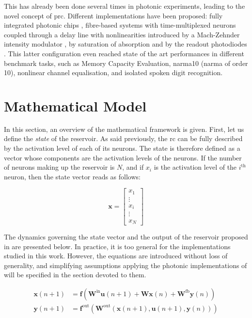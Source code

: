  This has already been done several times in photonic experiments, leading to the novel concept of \gls{prc}. Different implementations have been proposed: fully integrated photonic chips \cite{Vandoorne2014}, fibre-based systems with time-multiplexed neurons coupled through a delay line with nonlinearities introduced by a Mach-Zehnder intensity modulator \cite{Paquot2012, Antonik2017, Duport2016}, by saturation of absorption \cite{Dejonckheere2014, Vandoorne2008} and by the readout photodiodes \cite{Vinckier2015}. This latter configuration even reached state of the art performances in different benchmark tasks, such as Memory Capacity Evaluation, \acrshort{narma}10 (\acrlong{narma} of order 10), nonlinear channel equalisation, and isolated spoken digit recognition.  

\section{Mathematical Model}

\label{rc-mathematical-model}

In this section, an overview of the mathematical framework is given. First, let us define the \textit{state} of the reservoir. As said previously, the \gls{rc} can be fully described by the activation level of each of its neurons. The state is therefore defined as a vector whose components are the activation levels of the neurons. If the number of neurons making up the reservoir is $N$, and if $x_i$ is the activation level of the $i^{\text{th}}$ neuron, then the state vector reads as follows:

\begin{equation}
	\mathbf{x} = \begin{bmatrix}
		x_1\\
		\vdots \\
		x_i \\
		\vdots \\
		x_N
	\end{bmatrix}
\end{equation}

The dynamics governing the state vector and the output of the reservoir proposed in \cite{JaegerH.2001Tesa} are presented below. In practice, it is too general for the implementations studied in this work. However, the equations are introduced without loss of generality, and simplifying assumptions applying the photonic implementations of \rcer will be specified in the section devoted to them.

\begin{align}
	\mathbf{x}(n+1) &= \mathbf{f} \left( \mathbf{W}^{\text{in}} \mathbf{u}(n+1) + \mathbf{W} \mathbf{x}(n) + \mathbf{W}^{\text{fb}} \mathbf{y}(n) \right) \label{rc_dynamics}\\
	\mathbf{y}(n+1) &= \mathbf{f}^{\text{out}} \left( \mathbf{W}^{\text{out}} \left(\mathbf{x}(n+1), \mathbf{u}(n+1), \mathbf{y}(n)\right) \right) \label{rc_output}
\end{align}


